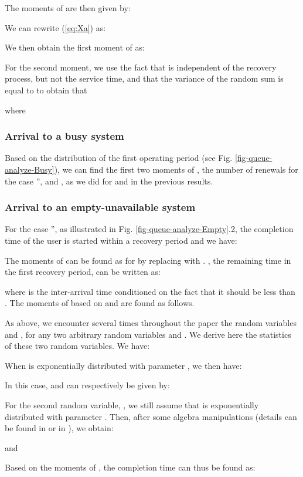\documentclass[11pt,journal,oneside,onecolumn,draftclsnofoot]{IEEEtran}
\begin{document}
The moments of  are then given by:

 
We can rewrite (\ref{eq:Xa}) as:

We then obtain the first moment of  as:

For the second moment, we use the fact that  is independent of the recovery process, but not the service time, and that the variance of the random sum  is equal to  to obtain that  

where

\subsubsection{Arrival to a busy system}
Based on the distribution of the first operating period  (see Fig. \ref{fig-queue-analyze-Busy}),
we can find the first two moments of , the number of renewals for the case '', and  , as we did for  and  in the previous results. 


\subsubsection{Arrival to an empty-unavailable system}
\label{app:stats}
For the case '', as illustrated in Fig. \ref{fig-queue-analyze-Empty}.2, the completion time of the user is started within a recovery period and we have: 



The moments of  can be found as for  by replacing  with . , the remaining time in the first recovery period, can be written as:

where  is the inter-arrival time conditioned on the fact that it should be less than . The moments of  based on  and  are found as follows. 

As above, we encounter several times throughout the paper the random variables  and , for any two arbitrary random variables  and . We derive here the statistics of these two random variables. We have: 

When  is exponentially distributed with parameter , we then have: 


In this case,  and  can respectively be given by:


For the second random variable, , we still assume that  is exponentially distributed with parameter . Then, after some algebra manipulations (details can be found in \cite[Lemma2]{federgruen86} or in \cite{takagi91}), we obtain: 

and 
 

Based on the moments of , the completion time can thus be found as:
\end{document}
